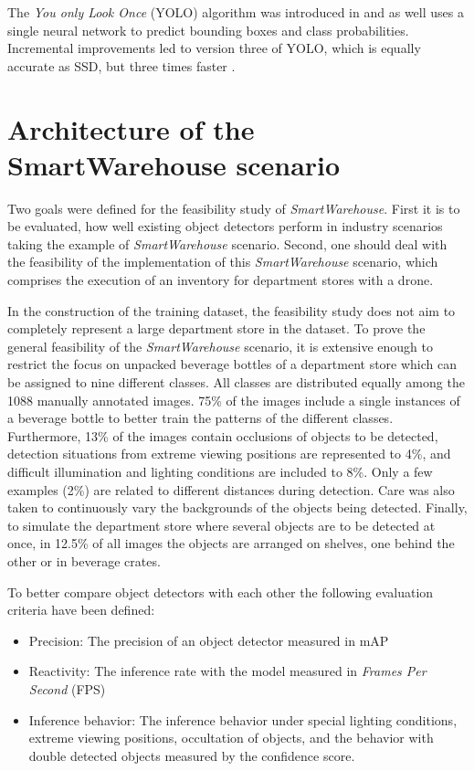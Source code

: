 \documentclass[a4paper, 10pt, journal]{wissarbIEEE}      %
\begin{document}
The \textit{You only Look Once} (YOLO) algorithm was introduced in \cite{JosephRedmonSantoshDivvalaRossGirshickAliFarhadi.2016} and as well uses a single neural network to predict bounding boxes and class probabilities. Incremental improvements led to version three of YOLO, which is equally accurate as SSD, but three times faster \cite{JosephRedmon.2018}. 

\section{Architecture of the SmartWarehouse scenario} \label{architecture}

Two goals were defined for the feasibility study of \textit{SmartWarehouse}. First it is to be evaluated, how well existing object detectors perform in industry scenarios taking the example of \textit{SmartWarehouse} scenario. Second, one should deal with the feasibility of the implementation of this \textit{SmartWarehouse} scenario, which comprises the execution of an inventory for department stores with a drone. 

In the construction of the training dataset, the feasibility study does not aim to completely represent a large department store in the dataset. To prove the general feasibility of the \textit{SmartWarehouse} scenario, it is extensive enough to restrict the focus on unpacked beverage bottles of a department store which can be assigned to nine different classes. All classes are distributed equally among the 1088 manually annotated images. 75\% of the images include a single instances of a beverage bottle to better train the patterns of the different classes. Furthermore, 13\% of the images contain occlusions of objects to be detected, detection situations from extreme viewing positions are represented to 4\%, and difficult illumination and lighting conditions are included to 8\%. Only a few examples (2\%) are related to different distances during detection. Care was also taken to continuously vary the backgrounds of the objects being detected. Finally, to simulate the department store where several objects are to be detected at once, in 12.5\% of all images the objects are arranged on shelves, one behind the other or in beverage crates. 

To better compare object detectors with each other the following evaluation criteria have been defined:

\begin{itemize}
	\item Precision: The precision of an object detector measured in mAP
	\item Reactivity: The inference rate with the model measured in \textit{Frames Per Second} (FPS)
	\item Inference behavior: The inference behavior under special lighting conditions, extreme viewing positions, occultation of objects, and the behavior with double detected objects measured by the confidence score. 
\end{itemize}
\end{document}
